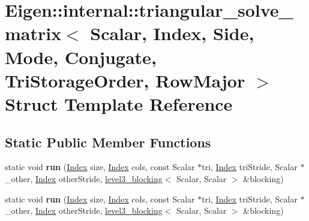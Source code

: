 \hypertarget{struct_eigen_1_1internal_1_1triangular__solve__matrix_3_01_scalar_00_01_index_00_01_side_00_01_m9c5e3cf61677ffd5b871aafbe3527bae}{}\section{Eigen\+:\+:internal\+:\+:triangular\+\_\+solve\+\_\+matrix$<$ Scalar, Index, Side, Mode, Conjugate, Tri\+Storage\+Order, Row\+Major $>$ Struct Template Reference}
\label{struct_eigen_1_1internal_1_1triangular__solve__matrix_3_01_scalar_00_01_index_00_01_side_00_01_m9c5e3cf61677ffd5b871aafbe3527bae}
\subsection*{Static Public Member Functions}
\begin{DoxyCompactItemize}
\item 
\mbox{\label{struct_eigen_1_1internal_1_1triangular__solve__matrix_3_01_scalar_00_01_index_00_01_side_00_01_m9c5e3cf61677ffd5b871aafbe3527bae_a0f3266b4b26c45da286cf8b5cfab4d56}} 
static void {\bfseries run} (\hyperlink{namespace_eigen_a62e77e0933482dafde8fe197d9a2cfde}{Index} size, \hyperlink{namespace_eigen_a62e77e0933482dafde8fe197d9a2cfde}{Index} cols, const Scalar $\ast$tri, \hyperlink{namespace_eigen_a62e77e0933482dafde8fe197d9a2cfde}{Index} tri\+Stride, Scalar $\ast$\+\_\+other, \hyperlink{namespace_eigen_a62e77e0933482dafde8fe197d9a2cfde}{Index} other\+Stride, \hyperlink{class_eigen_1_1internal_1_1level3__blocking}{level3\+\_\+blocking}$<$ Scalar, Scalar $>$ \&blocking)
\item 
\mbox{\label{struct_eigen_1_1internal_1_1triangular__solve__matrix_3_01_scalar_00_01_index_00_01_side_00_01_m9c5e3cf61677ffd5b871aafbe3527bae_a0f3266b4b26c45da286cf8b5cfab4d56}} 
static void {\bfseries run} (\hyperlink{namespace_eigen_a62e77e0933482dafde8fe197d9a2cfde}{Index} size, \hyperlink{namespace_eigen_a62e77e0933482dafde8fe197d9a2cfde}{Index} cols, const Scalar $\ast$tri, \hyperlink{namespace_eigen_a62e77e0933482dafde8fe197d9a2cfde}{Index} tri\+Stride, Scalar $\ast$\+\_\+other, \hyperlink{namespace_eigen_a62e77e0933482dafde8fe197d9a2cfde}{Index} other\+Stride, \hyperlink{class_eigen_1_1internal_1_1level3__blocking}{level3\+\_\+blocking}$<$ Scalar, Scalar $>$ \&blocking)
\end{DoxyCompactItemize}


